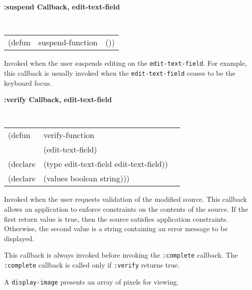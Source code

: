 {\samepage
{\large {\bf :suspend \hfill Callback, edit-text-field}} 
\begin{flushright} 
\parbox[t]{6.125in}{
\tt
\begin{tabular}{lll}
\raggedright
(defun & suspend-function & ())
\end{tabular}
\rm

}\end{flushright}}

\begin{flushright} \parbox[t]{6.125in}{
Invoked when the user suspends editing on the {\tt edit-text-field}. For
example, this callback is usually invoked when the {\tt edit-text-field} ceases
to be the keyboard focus. 

}\end{flushright}


{\samepage
{\large {\bf :verify \hfill Callback, edit-text-field}} 
\begin{flushright} 
\parbox[t]{6.125in}{
\tt
\begin{tabular}{lll}
\raggedright
(defun & verify-function \\
& (edit-text-field)\\
(declare & (type  edit-text-field  edit-text-field))\\
(declare   & (values boolean string)))
\end{tabular}
\rm

}\end{flushright}}

\begin{flushright} \parbox[t]{6.125in}{ 
Invoked when the user requests validation of the modified source. 
This callback allows an application to enforce constraints on the contents of
the source. If the first return value is true, then the source satisfies
application constraints. Otherwise, the second value is a string containing an
error message to be displayed.

This callback
is always invoked before invoking the {\tt :complete} callback. The {\tt
:complete} callback is called only if 
{\tt :verify} returns true.
}\end{flushright}





A {\tt display-image} presents an array of pixels  for viewing.


